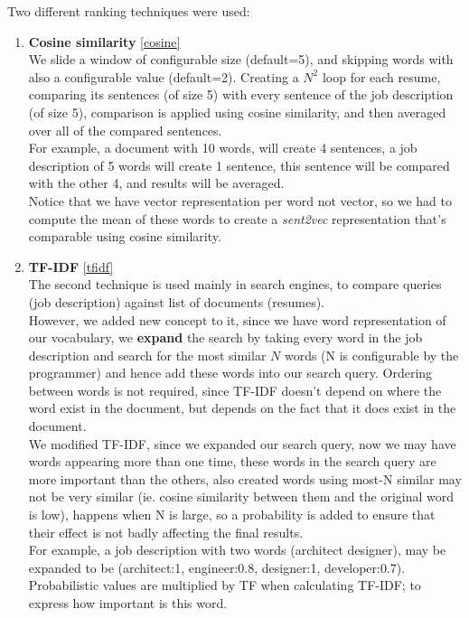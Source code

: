Two different ranking techniques were used:
\begin{enumerate}
    \item \textbf{Cosine similarity} \ref{cosine}\\
    
    We slide a window of configurable size (default=5), and skipping words with also a configurable value (default=2). Creating a $N^2$ loop for each resume, comparing its sentences (of size 5) with every sentence of the job description (of size 5), comparison is applied using cosine similarity, and then averaged over all of the compared sentences.\\
    
    For example, a document with 10 words, will create 4 sentences, a job description of 5 words will create 1 sentence, this sentence will be compared with the other 4, and results will be averaged.\\
    
    Notice that we have vector representation per word not vector, so we had to compute the mean of these words to create a \textit{sent2vec} representation that's comparable using cosine similarity.\\
    
    \item \textbf{TF-IDF} \ref{tfidf}\\
    
    The second technique is used mainly in search engines, to compare queries (job description) against list of documents (resumes).\\
    
    However, we added new concept to it, since we have word representation of our vocabulary, we \textbf{expand} the search by taking every word in the job description and search for the most similar $N$ words (N is configurable by the programmer) and hence add these words into our search query. Ordering between words is not required, since TF-IDF doesn't depend on where the word exist in the document, but depends on the fact that it does exist in the document.\\
    
    We modified TF-IDF, since we expanded our search query, now we may have words appearing more than one time, these words in the search query are more important than the others, also created words using most-N similar may not be very similar (ie. cosine similarity between them and the original word is low), happens when N is large, so a probability is added to ensure that their effect is not badly affecting the final results.\\
    
    For example, a job description with two words (architect designer), may be expanded to be (architect:1, engineer:0.8, designer:1, developer:0.7). Probabilistic values are multiplied by TF when calculating TF-IDF; to express how important is this word. 
    
\end{enumerate}


